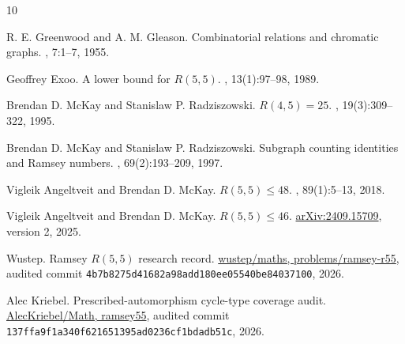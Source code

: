 \documentclass[11pt]{article}
\begin{document}
\footnotesize
\begin{thebibliography}{10}

R. E. Greenwood and A. M. Gleason.
\newblock Combinatorial relations and chromatic graphs.
, 7:1--7, 1955.

Geoffrey Exoo.
\newblock A lower bound for $R(5,5)$.
, 13(1):97--98, 1989.

Brendan D. McKay and Stanislaw P. Radziszowski.
\newblock $R(4,5)=25$.
, 19(3):309--322, 1995.

Brendan D. McKay and Stanislaw P. Radziszowski.
\newblock Subgraph counting identities and Ramsey numbers.
,
69(2):193--209, 1997.

Vigleik Angeltveit and Brendan D. McKay.
\newblock $R(5,5)\le48$.
, 89(1):5--13, 2018.

Vigleik Angeltveit and Brendan D. McKay.
\newblock $R(5,5)\le46$.
\newblock \href{https://arxiv.org/abs/2409.15709}{arXiv:2409.15709},
version 2, 2025.

Wustep.
\newblock Ramsey $R(5,5)$ research record.
\newblock
\href{https://github.com/wustep/maths/tree/4b7b8275d41682a98add180ee05540be84037100/problems/ramsey-r55}
{wustep/maths, problems/ramsey-r55},
audited commit \texttt{4b7b8275d41682a98add180ee05540be84037100},
2026.

Alec Kriebel.
\newblock Prescribed-automorphism cycle-type coverage audit.
\newblock
\href{https://github.com/AlecKriebel/Math/tree/137ffa9f1a340f621651395ad0236cf1bdadb51c/ramsey55}
{AlecKriebel/Math, ramsey55},
audited commit \texttt{137ffa9f1a340f621651395ad0236cf1bdadb51c},
2026.

\end{thebibliography}
\end{document}
